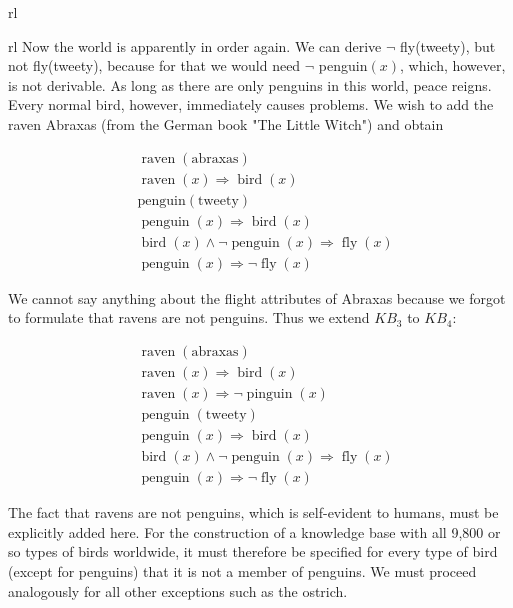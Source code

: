 \documentclass[10pt]{book}
\begin{document}
\begin{center}
\begin{tabular}{rl}
\begin{tabular}{rl}
Now the world is apparently in order again. We can derive $\neg$ fly(tweety), but not fly(tweety), because for that we would need $\neg$ penguin$(x)$, which, however, is not derivable. As long as there are only penguins in this world, peace reigns. Every normal bird, however, immediately causes problems. We wish to add the raven Abraxas (from the German book "The Little Witch") and obtain

\[
\begin{aligned}
& \operatorname{raven}(\text{abraxas}) \\
& \operatorname{raven}(x) \Rightarrow \operatorname{bird}(x) \\
& \text{penguin}(\text{tweety}) \\
& \operatorname{penguin}(x) \Rightarrow \operatorname{bird}(x) \\
& \operatorname{bird}(x) \wedge \neg \operatorname{penguin}(x) \Rightarrow \operatorname{fly}(x) \\
& \operatorname{penguin}(x) \Rightarrow \neg \operatorname{fly}(x)
\end{aligned}
\]

We cannot say anything about the flight attributes of Abraxas because we forgot to formulate that ravens are not penguins. Thus we extend $KB_{3}$ to $KB_{4}$:

\[
\begin{aligned}
& \operatorname{raven}(\text{abraxas}) \\
& \operatorname{raven}(x) \Rightarrow \operatorname{bird}(x) \\
& \operatorname{raven}(x) \Rightarrow \neg \operatorname{pinguin}(x) \\
& \operatorname{penguin}(\text{tweety}) \\
& \operatorname{penguin}(x) \Rightarrow \operatorname{bird}(x) \\
& \operatorname{bird}(x) \wedge \neg \operatorname{penguin}(x) \Rightarrow \operatorname{fly}(x) \\
& \operatorname{penguin}(x) \Rightarrow \neg \operatorname{fly}(x)
\end{aligned}
\]

The fact that ravens are not penguins, which is self-evident to humans, must be explicitly added here. For the construction of a knowledge base with all 9,800 or so
types of birds worldwide, it must therefore be specified for every type of bird (except for penguins) that it is not a member of penguins. We must proceed analogously for all other exceptions such as the ostrich.


\end{tabular}
\end{tabular}
\end{center}
\end{document}
